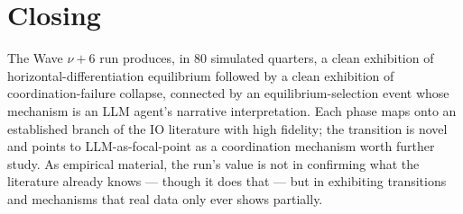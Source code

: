 \documentclass[11pt]{article}
\begin{document}
\section{Closing}

The Wave $\nu+6$ run produces, in 80 simulated quarters, a clean exhibition of horizontal-differentiation equilibrium followed by a clean exhibition of coordination-failure collapse, connected by an equilibrium-selection event whose mechanism is an LLM agent's narrative interpretation. Each phase maps onto an established branch of the IO literature with high fidelity; the transition is novel and points to LLM-as-focal-point as a coordination mechanism worth further study. As empirical material, the run's value is not in confirming what the literature already knows --- though it does that --- but in exhibiting transitions and mechanisms that real data only ever shows partially.


\end{document}
